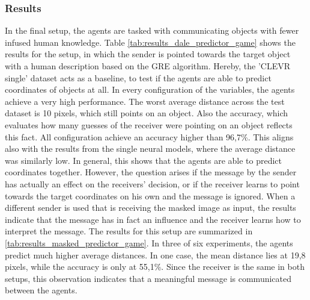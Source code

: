 \subsubsection*{Results}
In the final setup, the agents are tasked with communicating objects with fewer infused human knowledge.
Table \ref{tab:results_dale_predictor_game} shows the results for the setup, in which the sender is pointed towards the target object with a human description based on the GRE algorithm.
Hereby, the 'CLEVR single' dataset acts as a baseline, to test if the agents are able to predict coordinates of objects at all.
In every configuration of the variables, the agents achieve a very high performance.
The worst average distance across the test dataset is 10 pixels, which still points on an object.
Also the accuracy, which evaluates how many guesses of the receiver were pointing on an object reflects this fact.
All configuration achieve an accuracy higher than 96,7\%.
This aligns also with the results from the single neural models, where the average distance was similarly low.
In general, this shows that the agents are able to predict coordinates together.
However, the question arises if the message by the sender has actually an effect on the receivers' decision, or if the receiver learns to point towards the target coordinates on his own and the message is ignored.
When a different sender is used that is receiving the masked image as input, the results indicate that the message has in fact an influence and the receiver learns how to interpret the message.
The results for this setup are summarized in \ref{tab:results_masked_predictor_game}.
In three of six experiments, the agents predict much higher average distances.
In one case, the mean distance lies at 19,8 pixels, while the accuracy is only at 55,1\%.
Since the receiver is the same in both setups, this observation indicates that a meaningful message is communicated between the agents.

